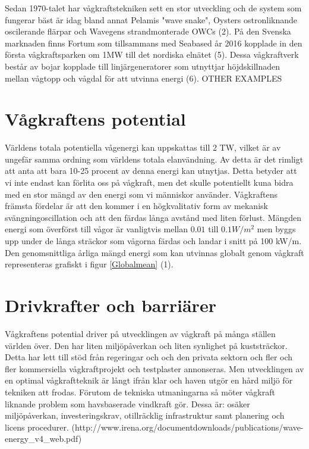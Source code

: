 \documentclass[10pt,a4paper,oneside]{article}
\begin{document}
Sedan 1970-talet har vågkraftstekniken sett en stor utveckling och de system som fungerar bäst är idag bland annat Pelamis "wave snake", Oysters ostronliknande oscilerande flärpar och Wavegens strandmonterade  OWCs (2). På den Svenska marknaden finns Fortum som tillsammans med Seabased år 2016 kopplade in den första vågkraftsparken om 1MW till det nordiska elnätet (5). Dessa vågkraftverk består av bojar kopplade till linjärgeneratorer som utnyttjar höjdskillnaden mellan vågtopp och vågdal för att utvinna energi (6). OTHER EXAMPLES 


\section{Vågkraftens potential}
Världens totala potentiella vågenergi kan uppskattas till 2 TW, vilket är av ungefär samma ordning som världens totala elanvändning. Av detta är det rimligt att anta att bara 10-25 procent av denna energi kan utnytjas. Detta betyder att vi inte endast kan förlita oss på vågkraft, men det skulle potentiellt kuna bidra med en stor mängd av den energi som vi människor använder. Vågkraftens främsta fördelar är att den kommer i en högkvalitativ form av mekanisk svängningoscillation och att den färdas långa avstånd med liten förlust. Mängden energi som överförst till vågor är vanligtvis mellan \begin{math} 0.01  \end{math} till \begin{math} 0.1 W/m^2 \end{math} men byggs upp under de långa sträckor som vågorna färdas och landar i snitt på 100 kW/m. Den genomsnittliga årliga mängd energi som kan utvinnas globalt genom vågkraft representeras grafiskt i figur \ref{Globalmean} (1). 

\section{Drivkrafter och barriärer}
Vågkraftens potential driver på utvecklingen av vågkraft på många ställen världen över. Den har liten miljöpåverkan och liten synlighet på kuststräckor. Detta har lett till stöd från regeringar och och den privata sektorn och fler och fler kommersiella vågkraftprojekt och testplaster annonseras. Men utvecklingen av en optimal vågkraftteknik är långt ifrån klar och haven utgör en hård miljö för tekniken att frodas. Förutom de tekniska utmaningarna så möter vågkraft liknande problem som havsbaserade vindkraft gör. Dessa är: osäker miljöpåverkan, investeringskrav, otillräcklig infrastruktur samt planering och licens procedurer. (http://www.irena.org/documentdownloads/publications/wave-energy_v4_web.pdf)
\end{document}
